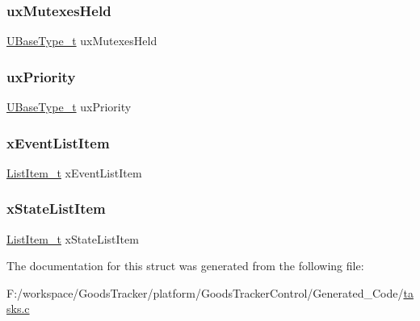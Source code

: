 \subsubsection{\texorpdfstring{ux\+Mutexes\+Held}{uxMutexesHeld}}
{\footnotesize\ttfamily \hyperlink{portmacro_8h_a646f89d4298e4f5afd522202b11cb2e6}{U\+Base\+Type\+\_\+t} ux\+Mutexes\+Held}

\mbox{\label{structtsk_task_control_block_a0befed3dd0fe55b4314158f4814f50ae}} 
\subsubsection{\texorpdfstring{ux\+Priority}{uxPriority}}
{\footnotesize\ttfamily \hyperlink{portmacro_8h_a646f89d4298e4f5afd522202b11cb2e6}{U\+Base\+Type\+\_\+t} ux\+Priority}

\mbox{\label{structtsk_task_control_block_a139605d93d834601f34be927ecba3a15}} 
\subsubsection{\texorpdfstring{x\+Event\+List\+Item}{xEventListItem}}
{\footnotesize\ttfamily \hyperlink{list_8h_a1a62d469392f9bfe2443e7efab9c8398}{List\+Item\+\_\+t} x\+Event\+List\+Item}

\mbox{\label{structtsk_task_control_block_a2575f6a579ef61db0db66d7b1b52ec48}} 
\subsubsection{\texorpdfstring{x\+State\+List\+Item}{xStateListItem}}
{\footnotesize\ttfamily \hyperlink{list_8h_a1a62d469392f9bfe2443e7efab9c8398}{List\+Item\+\_\+t} x\+State\+List\+Item}



The documentation for this struct was generated from the following file\+:\begin{DoxyCompactItemize}
\item 
F\+:/workspace/\+Goods\+Tracker/platform/\+Goods\+Tracker\+Control/\+Generated\+\_\+\+Code/\hyperlink{tasks_8c}{tasks.\+c}\end{DoxyCompactItemize}
